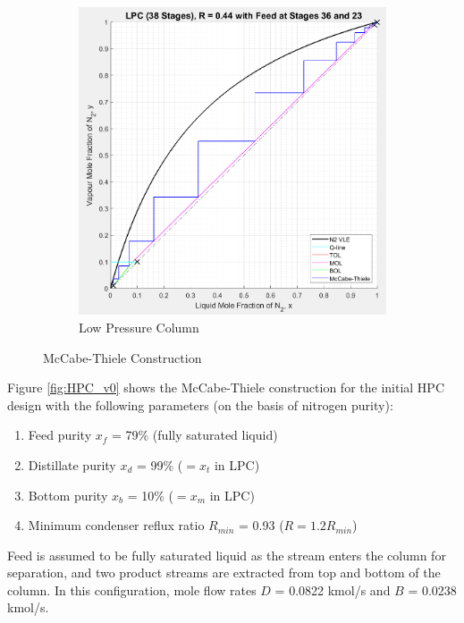 \begin{figure}[H]
\begin{subfigure}{0.49\textwidth}
                \includegraphics[width=\linewidth]{LPC_v0.jpeg}
                \caption{Low Pressure Column}
                \label{fig:LPC_v0}
            \end{subfigure}
            \caption{McCabe-Thiele Construction}                        \label{fig:mccabe_v0}
        \end{figure}
        \noindent Figure \ref{fig:HPC_v0} shows the McCabe-Thiele construction for the initial HPC design with the following parameters (on the basis of nitrogen purity):
        \begin{enumerate}
            \item Feed purity $x_f$ = 79\% (fully saturated liquid)
            \item Distillate purity $x_d$ = 99\% ($=x_t$ in LPC)
            \item Bottom purity $x_b$ = 10\% ($=x_m$ in LPC)
            \item Minimum condenser reflux ratio $R_{min}$ = 0.93 ($R = 1.2R_{min}$)
        \end{enumerate}
        Feed is assumed to be fully saturated liquid as the stream enters the column for separation, and two product streams are extracted from top and bottom of the column. In this configuration, mole flow rates $D$ = 0.0822 kmol/s and $B$ = 0.0238 kmol/s. \\
